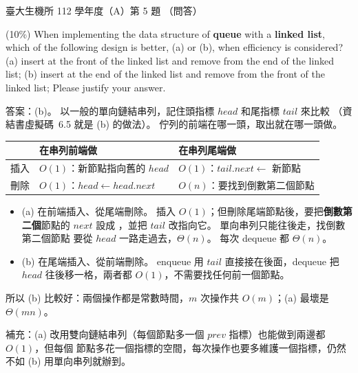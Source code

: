 \begin{pastexam}[label={px:ntu-112-bime-ds-05}]{臺大生機所 112 學年度（A）第 5 題}
（問答）

(10\%) When implementing the data structure of \textbf{queue} with a \textbf{linked list}, which
of the following design is better, (a) or (b), when efficiency is considered? (a) insert at the
front of the linked list and remove from the end of the linked list; (b) insert at the end of
the linked list and remove from the front of the linked list; Please justify your answer.
\end{pastexam}

\begin{pastsoln}
答案：(b)。 以一般的單向鏈結串列，記住頭指標 $\mathit{head}$ 和尾指標 $\mathit{tail}$ 來比較
（資結書虛擬碼~6.5 就是 (b) 的做法）。 佇列的前端在哪一頭，取出就在哪一頭做。

\begin{center}
\begin{tabular}{lll}
\toprule
 & 在串列前端做 & 在串列尾端做 \\
\midrule
插入 & $O(1)$：新節點指向舊的 $\mathit{head}$ & $O(1)$：$\mathit{tail}.\mathit{next} \gets$ 新節點 \\
刪除 & $O(1)$：$\mathit{head} \gets \mathit{head}.\mathit{next}$ & $O(n)$：要找到倒數第二個節點 \\
\bottomrule
\end{tabular}
\end{center}

\begin{itemize}
\item (a) 在前端插入、從尾端刪除。 插入 $O(1)$；但刪除尾端節點後，要把\textbf{倒數第二個}節點的
$\mathit{next}$ 設成 \NIL，並把 $\mathit{tail}$ 改指向它。 單向串列只能往後走，找倒數第二個節點
要從 $\mathit{head}$ 一路走過去，$\Theta(n)$。 每次 dequeue 都 $\Theta(n)$。
\item (b) 在尾端插入、從前端刪除。 enqueue 用 $\mathit{tail}$ 直接接在後面，dequeue 把
$\mathit{head}$ 往後移一格，兩者都 $O(1)$，不需要找任何前一個節點。
\end{itemize}
所以 (b) 比較好：兩個操作都是常數時間，$m$ 次操作共 $O(m)$；(a) 最壞是 $\Theta(mn)$。

補充：(a) 改用雙向鏈結串列（每個節點多一個 $\mathit{prev}$ 指標）也能做到兩邊都 $O(1)$，但每個
節點多花一個指標的空間，每次操作也要多維護一個指標，仍然不如 (b) 用單向串列就辦到。
\end{pastsoln}
